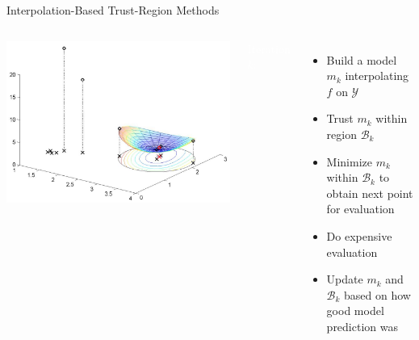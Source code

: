 \documentclass[handout,aspectratio=54]{beamer}
\numberwithin{theorem}{section}
\begin{document}
\begin{frame}{Interpolation-Based Trust-Region Methods}
\begin{columns}
\includegraphics[width=\textwidth]{fig/25-3.jpg}

\colorbox[rgb]{0.5,0.6,0.7}{\textcolor{white}{Iteration $k$:}}
\begin{itemize}\small
\item  Build a model $m_k$ interpolating $f$ on $\mathcal{Y}$
\item Trust $m_k$ within region $\mathcal{B}_k$
\item Minimize $m_k$ within $\mathcal{B}_k$ to obtain next point for evaluation
\item Do expensive evaluation
\item Update $m_k$ and $\mathcal{B}_k$ based on how good model prediction was
\end{itemize}
\end{columns}
\end{frame}
\end{document}

